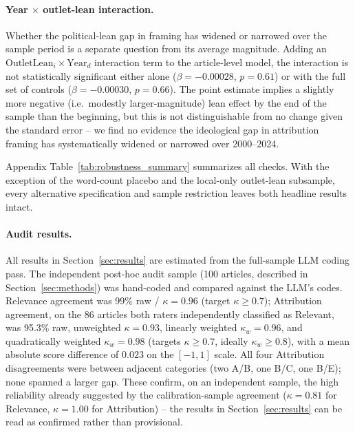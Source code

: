 \documentclass[12pt]{article}
\begin{document}
\paragraph{Year $\times$ outlet-lean interaction.} Whether the
political-lean gap in framing has widened or narrowed over the sample
period is a separate question from its average magnitude. Adding an
$\text{OutletLean}_i \times \text{Year}_d$ interaction term to the
article-level model, the interaction is not statistically significant
either alone ($\beta=-0.00028$, $p=0.61$) or with the full set of controls
($\beta=-0.00030$, $p=0.66$). The point estimate implies a slightly more
negative (i.e.\ modestly larger-magnitude) lean effect by the end of the
sample than the beginning, but this is not distinguishable from no change
given the standard error -- we find no evidence the ideological gap in
attribution framing has systematically widened or narrowed over
2000--2024.

Appendix Table~\ref{tab:robustness_summary} summarizes all checks. With
the exception of the word-count placebo and the local-only outlet-lean
subsample, every alternative specification and sample restriction leaves
both headline results intact.

\paragraph{Audit results.} All results in Section~\ref{sec:results} are
estimated from the full-sample LLM coding pass. The independent post-hoc
audit sample (100 articles, described in Section~\ref{sec:methods}) was
hand-coded and compared against the LLM's codes. Relevance
agreement was 99\% raw / $\kappa = 0.96$ (target $\kappa \geq 0.7$);
Attribution agreement, on the 86 articles both raters independently
classified as Relevant, was 95.3\% raw, unweighted $\kappa = 0.93$,
linearly weighted $\kappa_w = 0.96$, and quadratically weighted
$\kappa_w = 0.98$ (targets $\kappa \geq 0.7$, ideally $\kappa_w \geq 0.8$),
with a mean absolute score difference of $0.023$ on the $[-1,1]$ scale.
All four Attribution disagreements were between adjacent categories (two
A/B, one B/C, one B/E); none spanned a larger gap. These confirm, on an
independent sample, the high reliability already suggested by the
calibration-sample agreement ($\kappa=0.81$ for Relevance, $\kappa=1.00$
for Attribution) -- the results in Section~\ref{sec:results} can be read
as confirmed rather than provisional.


\end{document}
